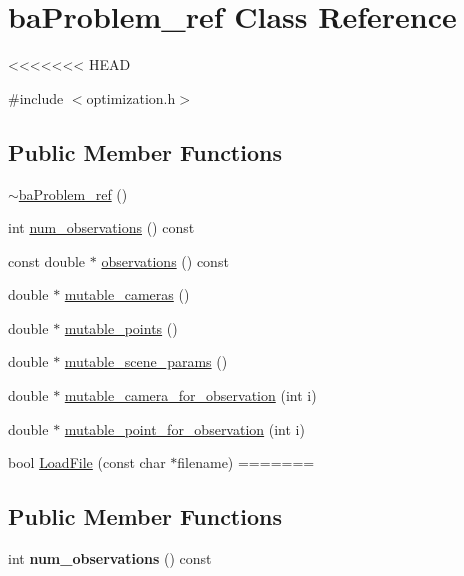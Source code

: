\hypertarget{classbaProblem__ref}{\section{ba\-Problem\-\_\-ref Class Reference}
\label{d2/d3f/classbaProblem__ref}
}
<<<<<<< HEAD


{\ttfamily \#include $<$optimization.\-h$>$}

\subsection*{Public Member Functions}
\begin{DoxyCompactItemize}
\item 
\hyperlink{classbaProblem__ref_a8eb852f63eb07f0c699eb21c1aa99ebb}{$\sim$ba\-Problem\-\_\-ref} ()
\item 
int \hyperlink{classbaProblem__ref_a0c4fae03745061e468c90f31bb3c3a36}{num\-\_\-observations} () const 
\item 
const double $\ast$ \hyperlink{classbaProblem__ref_a80cd1a4c54c8dd32cc183da7c94d1e56}{observations} () const 
\item 
double $\ast$ \hyperlink{classbaProblem__ref_a90468afc78c2e244364fe218a53392af}{mutable\-\_\-cameras} ()
\item 
double $\ast$ \hyperlink{classbaProblem__ref_a926b72fd733cd727a98faf38748b0c73}{mutable\-\_\-points} ()
\item 
double $\ast$ \hyperlink{classbaProblem__ref_a63109b77ebee946d9c278a6124447221}{mutable\-\_\-scene\-\_\-params} ()
\item 
double $\ast$ \hyperlink{classbaProblem__ref_ad8a8ec7cd0449706b6472dbb2637d86a}{mutable\-\_\-camera\-\_\-for\-\_\-observation} (int i)
\item 
double $\ast$ \hyperlink{classbaProblem__ref_afabc124e4d51af38b22cd82ba456c524}{mutable\-\_\-point\-\_\-for\-\_\-observation} (int i)
\item 
bool \hyperlink{classbaProblem__ref_ad8d56df86b80e06a25ea4759b7a46196}{Load\-File} (const char $\ast$filename)
=======
\subsection*{Public Member Functions}
\begin{DoxyCompactItemize}
\item 
\hypertarget{classbaProblem__ref_a0c4fae03745061e468c90f31bb3c3a36}{int {\bfseries num\-\_\-observations} () const }\label{d2/d3f/classbaProblem__ref_a0c4fae03745061e468c90f31bb3c3a36}


\end{DoxyCompactItemize}
\end{DoxyCompactItemize}
